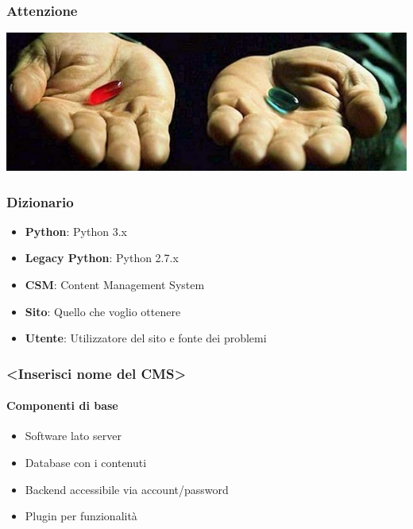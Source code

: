 \begin{frame}
	\frametitle{Attenzione}
	\begin{center}
		\includegraphics[scale=0.5]{img/pillole}
	\end{center}

\end{frame}


\begin{frame}
	\frametitle{Dizionario}
	\begin{itemize}
		\item \textbf{Python}: Python 3.x
		\item \textbf{Legacy Python}: Python 2.7.x
		\item \textbf{CSM}: Content Management System
		\item \textbf{Sito}: Quello che voglio ottenere
		\item \textbf{Utente}: Utilizzatore del sito e fonte dei problemi
	\end{itemize}
\end{frame}

\begin{frame}
	\frametitle{<Inserisci nome del CMS>}
	\framesubtitle{Componenti di base}
	\begin{itemize}
		\item<2-> Software lato server
		\item<3-> Database con i contenuti
		\item<4-> Backend accessibile via account/password
		\item<5-> Plugin per funzionalità
	\end{itemize}
\end{frame}

